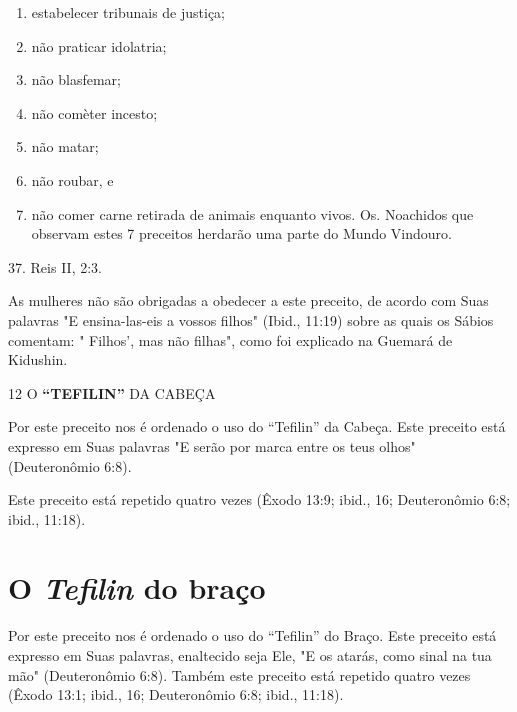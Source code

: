 \begin{enumerate}
\def\labelenumi{(\arabic{enumi})}
\item
 
 estabelecer tribunais de justiça;
 
\item
 
 não praticar idolatria;
 
\item
 
 não blasfemar;
 
\item
 
 não comèter incesto;
 
\item
 
 não matar;
 
\item
 
 não roubar, e
 
\item
 
 não comer carne retirada de animais enquanto vivos. Os. Noachidos que
 obser­vam estes 7 preceitos herdarão uma parte do Mundo Vindouro.
 
\end{enumerate}


37. Reis II, 2:3.



As mulheres não são obrigadas a obedecer a este preceito, de acor­do com
Suas palavras "E ensina-las-eis a vossos filhos" (Ibid., 11:19) sobre as
quais os Sábios comentam: " Filhos', mas não filhas", como foi explicado
na Guemará de Kidushin.

12 O \textbf{``TEFILIN''} DA CABEÇA

Por este preceito nos é ordenado o uso do ``Tefilin'' da Cabeça. Este
preceito está expresso em Suas palavras "E serão por marca entre os teus
olhos" (Deuteronômio 6:8).

Este preceito está repetido quatro vezes (Êxodo 13:9; ibid., 16;
Deu­teronômio 6:8; ibid., 11:18).

\section{O \emph{Tefilin} do braço}

Por este preceito nos é ordenado o uso do ``Tefilin'' do Braço. Este
preceito está expresso em Suas palavras, enaltecido seja Ele, "E os
atarás, como sinal na tua mão" (Deuteronômio 6:8). Também este preceito
está repetido qua­tro vezes (Êxodo 13:1; ibid., 16; Deuteronômio 6:8;
ibid., 11:18).

